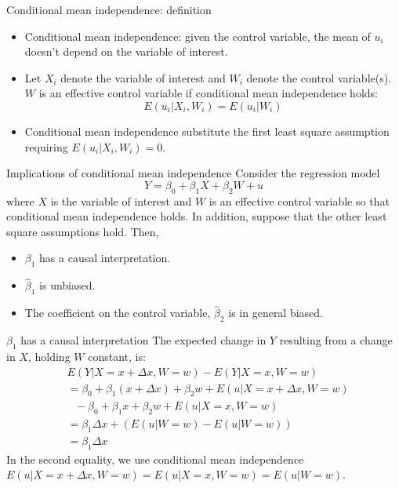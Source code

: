 \documentclass[presentation,10pt]{beamer}
\begin{document}
\begin{frame}[label={sec:org369f95f}]{Conditional mean independence: definition}
\begin{itemize}
\item \alert{Conditional mean independence}: given the
control variable, the mean of \(u_i\) doesn’t depend on the variable of
interest.
\end{itemize}

\vspace{0.2cm}

\begin{itemize}
\item Let \(X_i\) denote the variable of interest and \(W_i\) denote the control
variable(s).  \(W\) is an effective control variable if conditional mean
independence holds:
\[ E(u_i|X_i, W_i) = E(u_i|W_i) \]

\item Conditional mean independence substitute the first least square
assumption requiring \(E(u_i | X_i, W_i) = 0\).
\end{itemize}
\end{frame}

\begin{frame}[label={sec:orga53fed1}]{Implications of conditional mean independence}
Consider the regression model
\[ Y = \beta_0 + \beta_1 X + \beta_2 W + u \]
where \(X\) is the variable of interest and \(W\) is an effective control
variable so that conditional mean independence holds. In addition,
suppose that the other least square assumptions hold. Then,
\begin{itemize}
\item \(\beta_1\) has a causal interpretation.
\item \(\hat{\beta}_1\) is unbiased.
\item The coefficient on the control variable, \(\hat{\beta}_2\) is in
general biased.
\end{itemize}
\end{frame}

\begin{frame}[label={sec:org1486948}]{\(\beta_1\) has a causal interpretation}
The expected change in \(Y\) resulting from a change in \(X\), holding \(W\)
constant, is:
\begin{equation*}
\begin{split}
& E(Y|X = x + \Delta x, W = w) - E(Y|X = x, W = w) \\
&= \beta_0 + \beta_1(x + \Delta x) + \beta_2 w + E(u|X = x + \Delta x, W = w) \\
&\text{ } - \beta_0 + \beta_1 x + \beta_2 w + E(u|X = x, W = w) \\
&= \beta_1 \Delta x + \left( E(u|W = w) -  E(u|W = w) \right) \\
&= \beta_1 \Delta x
\end{split}
\end{equation*}
In the second equality, we use conditional mean independence \(E(u|X =
x + \Delta x, W = w) = E(u|X = x, W = w) = E(u|W = w)\).
\end{frame}
\end{document}
